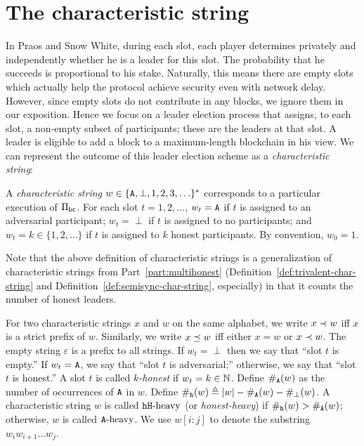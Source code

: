 \section{The characteristic string}
In Praos and Snow White, 
during each slot, 
each player determines privately and independently 
whether he is a leader for this slot. 
The probability that he succeeds is proportional to his stake. 
Naturally, this means there are empty slots 
which actually help the protocol achieve 
security even with network delay. 
However, since empty slots do not contribute in any blocks, 
we ignore them in our exposition. 
Hence we focus on a leader election process that assigns, 
to each slot, 
a non-empty subset of participants; 
these are the leaders at that slot. 
A leader is eligible to add a block to a 
maximum-length blockchain in his view. 
We can represent the outcome of this leader election scheme 
as a \emph{characteristic string}:


\begin{definition}\label{def:char-string-praos}
  A \emph{characteristic string} $w \in \{\mathtt{A}, 
  \perp, 
  1, 2, 3, \ldots \}^*$ 
  corresponds to a particular execution of $\Pi_\mathsf{bc}$.
  For each slot $t = 1, 2, \ldots$, 
  $w_t = \mathtt{A}$ if $t$ is assigned to an adversarial participant; 
  $w_t = \perp$ if $t$ is assigned to no participants; 
  and 
  $w_t = k \in \{1,2,\ldots\}$ if $t$ is assigned to $k$ honest participants.
  By convention, $w_0 = 1$.
\end{definition}

Note that the above definition of characteristic strings 
is a generalization of characteristic strings 
from Part~\ref{part:multihonest} 
(Definition~\ref{def:trivalent-char-string} 
and Definition~\ref{def:semisync-char-string}, especially)
in that it counts the number of honest leaders. 


For two characteristic strings $x$ and $w$ on the same alphabet, 
we write $x \prec w$ iff $x$ is a strict prefix of $w$. 
Similarly, 
we write $x \preceq w$ iff either $x = w$ or $x \prec w$. 
The empty string $\varepsilon$ is a prefix to all strings. 
If $w_t = \perp$ then we say that ``slot $t$ is empty.'' 
If $w_t = \mathtt{A}$, we say that ``slot $t$ is adversarial;'' 
otherwise, we say that ``slot $t$ is honest.'' 
A slot $t$ is called \emph{$k$-honest} if $w_t = k \in \mathbb{N}$.
Define $\#_{\mathtt{A}}(w)$ as the number of occurrences of $\mathtt{A}$ in $w$. 
Define $\#_{\mathtt{h}}(w) \triangleq |w| - \#_{\mathtt{A}}(w) 
- \#_\perp(w)
$.
A characteristic string $w$ is called $\mathtt{h}\mathtt{H}\text{-heavy}$ (or \emph{honest-heavy}) if 
$\#_{\mathtt{h}}(w) > \#_{\mathtt{A}}(w)$; 
otherwise, $w$ is called $\mathtt{A}\text{-heavy}$. 
We use $w[i : j]$ to denote the substring $w_i w_{i+1}\ldots w_j$.

